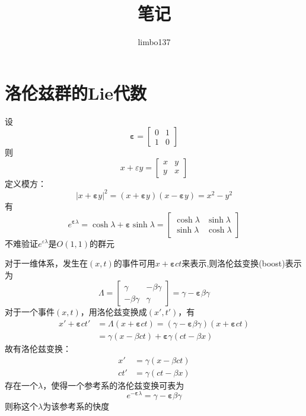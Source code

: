 \documentclass[utf8]{ctexart}
\title{笔记}
\author{limbo137}
\date{}
\begin{document}
\maketitle
\section{洛伦兹群的Lie代数}
设
\[{\boldsymbol{\varepsilon}}= 
\begin{bmatrix}
0 & 1 \\ 1 & 0
\end{bmatrix} \]
则
\[x+\varepsilon y=
\begin{bmatrix}
x & y \\ y & x
\end{bmatrix} \]
定义模方：
\[|x+{\boldsymbol{\varepsilon}} y|^2=(x+{\boldsymbol{\varepsilon}} y)(x-{\boldsymbol{\varepsilon}} y)=x^2-y^2\]
有
\[e^{{\boldsymbol{\varepsilon}}\lambda}=\cosh{\lambda}+{\boldsymbol{\varepsilon}}\sinh{\lambda}=\begin{bmatrix}
\cosh{\lambda} & \sinh{\lambda} \\ \sinh{\lambda} & \cosh{\lambda}
\end{bmatrix} \]
不难验证$e^{\varepsilon\lambda}$是$O(1,1)$的群元

对于一维体系，发生在$(x,t)$的事件可用$x+{\boldsymbol{\varepsilon}} ct$来表示,则洛伦兹变换(boost)表示为
\[\Lambda=\begin{bmatrix}
\gamma & -\beta\gamma \\ -\beta\gamma & \gamma
\end{bmatrix}=\gamma-{\boldsymbol{\varepsilon}}\beta\gamma\]
对于一个事件$(x,t)$，用洛伦兹变换成$(x',t')$，有
\begin{equation*}
    \begin{split}
        x'+{\boldsymbol{\varepsilon}} ct'
        &=\Lambda(x+{\boldsymbol{\varepsilon}}ct)=(\gamma-{\boldsymbol{\varepsilon}}\beta\gamma)(x+{\boldsymbol{\varepsilon}} ct)\\&=\gamma(x-\beta ct)+{\boldsymbol{\varepsilon}}\gamma(ct-\beta x)
    \end{split}
\end{equation*}
故有洛伦兹变换：
\begin{equation*}
    \begin{split}
    x'&=\gamma(x-\beta ct)\\
    ct'&=\gamma(ct-\beta x)
    \end{split}
\end{equation*}
存在一个$\lambda$，使得一个参考系的洛伦兹变换可表为
\[e^{{-\boldsymbol{\varepsilon}}\lambda}=\gamma-{\boldsymbol{\varepsilon}}\beta\gamma\]
则称这个$\lambda$为该参考系的快度
\end{document}
